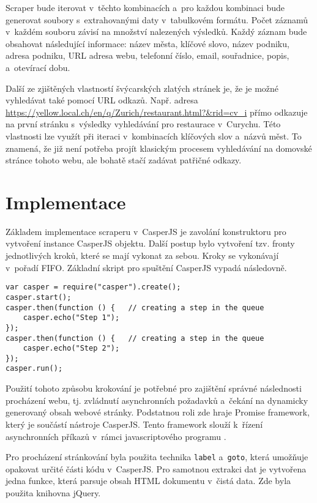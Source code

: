 \documentclass[11pt,a4paper]{article}
\begin{document}
Scraper bude iterovat v~těchto kombinacích a~pro každou kombinaci bude generovat soubory s~extrahovanými daty v~tabulkovém formátu. Počet záznamů v~každém souboru závisí na množství nalezených výsledků. Každý záznam bude obsahovat následující informace: název města, klíčové slovo, název podniku, adresa podniku, URL adresa webu, telefonní číslo, email, souřadnice, popis, a~otevírací dobu.

Další ze zjištěných vlastností švýcarských zlatých stránek je, že je možné vyhledávat také pomocí URL odkazů. Např. adresa \url{https://yellow.local.ch/en/q/Zurich/restaurant.html?&rid=cv_i} přímo odkazuje na první stránku s~výsledky vyhledávání pro restaurace v~Curychu. Této vlastnosti lze využít při iteraci v~kombinacích klíčových slov a~názvů měst. To znamená, že již není potřeba projít klasickým procesem vyhledávání na domovské stránce tohoto webu, ale bohatě stačí zadávat patřičné odkazy.

\newpage


\section{Implementace}
Základem implementace scraperu v~CasperJS je zavolání konstruktoru pro vytvoření instance CasperJS objektu. Další postup bylo vytvoření tzv. fronty jednotlivých kroků, které se mají vykonat za sebou. Kroky se vykonávají v~pořadí FIFO. Základní skript pro spuštění CasperJS vypadá následovně.

\begin{lstlisting}[caption=Základní skript pro CasperJS]
var casper = require("casper").create();
casper.start();
casper.then(function () {   // creating a step in the queue
    casper.echo("Step 1");
});
casper.then(function () {   // creating a step in the queue
    casper.echo("Step 2");
});
casper.run();
\end{lstlisting}

Použití tohoto způsobu krokování je potřebné pro zajištění správné následnosti procházení webu, tj. zvládnutí asynchronních požadavků a~čekání na dynamicky generovaný obsah webové stránky. Podstatnou roli zde hraje Promise framework, který je součástí nástroje CasperJS. Tento framework slouží k~řízení asynchronních příkazů v~rámci javascriptového programu \cite{sugrue}.

Pro procházení stránkování byla použita technika \texttt{label} a~\texttt{goto}, která umožňuje opakovat určité části kódu v~CasperJS. Pro samotnou extrakci dat je vytvořena jedna funkce, která parsuje obsah HTML dokumentu v~čistá data. Zde byla použita knihovna jQuery.
\end{document}
